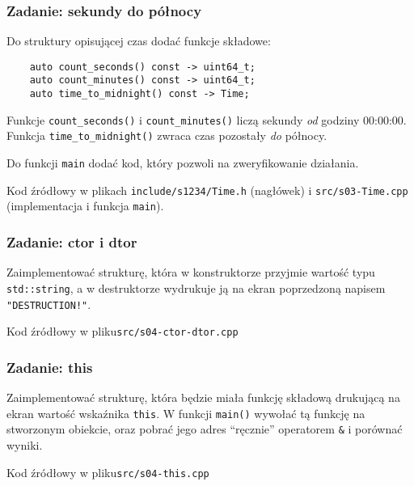 \documentclass[aspectratio=169,10pt]{beamer}
\begin{document}
\begin{frame}[fragile]
    \frametitle{Zadanie: sekundy do północy}
    \label{lecture_exercise_4}

    Do struktury opisującej czas dodać funkcje składowe:

    {\scriptsize
    \begin{lstlisting}
    auto count_seconds() const -> uint64_t;
    auto count_minutes() const -> uint64_t;
    auto time_to_midnight() const -> Time;
    \end{lstlisting}}

    Funkcje \texttt{count\_seconds()} i \texttt{count\_minutes()} liczą sekundy
    \emph{od} godziny 00:00:00.\\
    Funkcja \texttt{time\_to\_midnight()} zwraca czas pozostały \emph{do} północy.

    Do funkcji \texttt{main} dodać kod, który pozwoli na zweryfikowanie
    działania.

    \vspace{1em}

    {\footnotesize
    Kod źródłowy w plikach {\tt include/s1234/Time.h} (nagłówek) i
    {\tt src/s03-Time.cpp} (implementacja i funkcja {\tt main}).}
\end{frame}

\begin{frame}
    \frametitle{Zadanie: ctor i dtor}
    \label{lecture_exercise_5}

    Zaimplementować strukturę, która w konstruktorze przyjmie wartość typu
    \texttt{std::string}, a w destruktorze wydrukuje ją na ekran poprzedzoną
    napisem \texttt{"DESTRUCTION!"}.

    \vspace{1em}

    {\footnotesize
    Kod źródłowy w pliku{\tt src/s04-ctor-dtor.cpp}}
\end{frame}

\begin{frame}
    \frametitle{Zadanie: this}
    \label{lecture_exercise_6}

    Zaimplementować strukturę, która będzie miała funkcję składową drukującą na
    ekran wartość wskaźnika \texttt{this}. W funkcji \texttt{main()} wywołać tą
    funkcję na stworzonym obiekcie, oraz pobrać jego adres ``ręcznie''
    operatorem \texttt{\&} i porównać wyniki.

    \vspace{1em}

    {\footnotesize
    Kod źródłowy w pliku{\tt src/s04-this.cpp}}
\end{frame}
\end{document}
